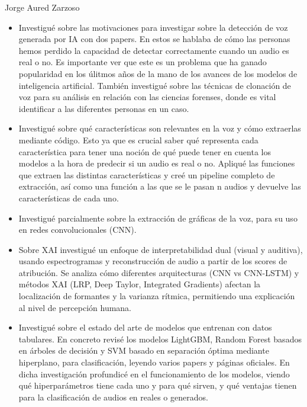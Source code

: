 \begin{contribucion}{Jorge Aured Zarzoso}

\begin{itemize}

	\item Investigué sobre las motivaciones para investigar sobre la detección de voz generada por IA con dos papers. En estos se hablaba de cómo las personas hemos perdido la capacidad de detectar correctamente cuando un audio es real o no. Es importante ver que este es un problema que ha ganado popularidad en los úlitmos años de la mano de los avances de los modelos de inteligencia artificial. También investigué sobre las técnicas de clonación de voz para su análisis en relación con las ciencias forenses, donde es vital identificar a las diferentes personas en un caso.
	
	\item Investigué sobre qué características son relevantes en la voz y cómo extraerlas mediante código. Esto ya que es crucial saber qué representa cada característica para tener una noción de qué puede tener en cuenta los modelos a la hora de predecir si un audio es real o no.  Apliqué las funciones que extraen las distintas características y creé un pipeline completo de extracción, así como una función a las que se le pasan n audios y devuelve las características de cada uno.
	
	\item Investigué parcialmente sobre la extracción de gráficas de la voz, para su uso en redes convolucionales (CNN).	
	
	 \item Sobre XAI investigué un enfoque de interpretabilidad dual (visual y auditiva), usando espectrogramas y reconstrucción de audio a partir de los scores de atribución. Se analiza cómo diferentes arquitecturas (CNN vs CNN-LSTM) y métodos XAI (LRP, Deep Taylor, Integrated Gradients) afectan la localización de formantes y la varianza rítmica, permitiendo una explicación al nivel de percepción humana.
	 
	 \item Investigué sobre el estado del arte de modelos que entrenan con datos tabulares. En concreto revisé los modelos LightGBM, Random Forest basados en árboles de decisión y SVM basado en separación óptima mediante hiperplano, para clasificación, leyendo varios papers y páginas oficiales. En dicha investigación profundicé en el funcionamiento de los modelos, viendo qué hiperparámetros tiene cada uno y para qué sirven, y qué ventajas tienen para la clasificación de audios en reales o generados.
	 

\end{itemize}
\end{contribucion}
